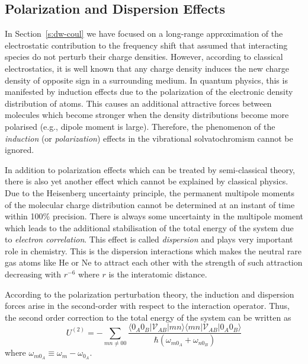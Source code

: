 \documentclass[b5paper,oneside,fleqn,11pt]{book}
\begin{document}
\begin{refsection}
\subsection{Polarization and Dispersion Effects\label{s:dw-poldisp}}

In Section~\ref{s:dw-coul} we have focused on a long\hyp{}range
approximation of the electrostatic contribution to the frequency
shift that assumed that interacting species do not perturb
their charge densities. However, according to classical electrostatics,
it is well known that any charge density induces the new
charge density of opposite sign in a surrounding medium. In quantum
physics, this is manifested by induction effects due to the polarization
of the electronic density distribution of atoms. This causes
an additional attractive forces between molecules which
become stronger when the density distributions become more polarised
(e.g., dipole moment is large). Therefore, the
phenomenon of the \emph{induction} (or \emph{polarization}) effects
in the vibrational solvatochromism cannot be ignored.

In addition to polarization effects which can be treated
by semi\hyp{}classical theory, there is also yet another effect
which cannot be explained by classical physics. Due to the Heisenberg
uncertainty principle, the permanent multipole moments of the 
molecular charge distribution cannot be determined at an instant
of time within 100\% precision. There is always some uncertainty
in the multipole moment which leads to the additional stabilisation
of the total energy of the system due to \emph{electron correlation}. This effect is
called \emph{dispersion} and plays very important role in chemistry.
This is the dispersion interactions which makes the neutral rare gas atoms 
like He or Ne
to attract each other with the strength of such attraction decreasing
with $r^{-6}$ where $r$ is the interatomic distance.

According to the polarization perturbation theory, the induction
and dispersion forces arise in the second\hyp{}order with respect to
the interaction 
operator. \citep{Stone.TheTheoryOfIntermolecularForces.1996,
Jeziorski.Moszynski.Szalewicz.ChemRev.1994} 
Thus, the second order correction to the total
energy of the system can be written as
%
\begin{equation} \label{e:eint-2}
U^{(2)} = - \sum_{mn\ne 00} \frac{
\langle 0_A0_B \lvert \mathscr{V}_{AB} \rvert mn \rangle \langle  mn \lvert \mathscr{V}_{AB} \rvert 0_A0_B \rangle
}{\hbar \left( \omega_{m0_A} + \omega_{n0_B}\right)}
\end{equation}
%
where $\omega_{m0_A} \equiv \omega_{m} - \omega_{0_A}$.


\end{refsection}
\end{document}
